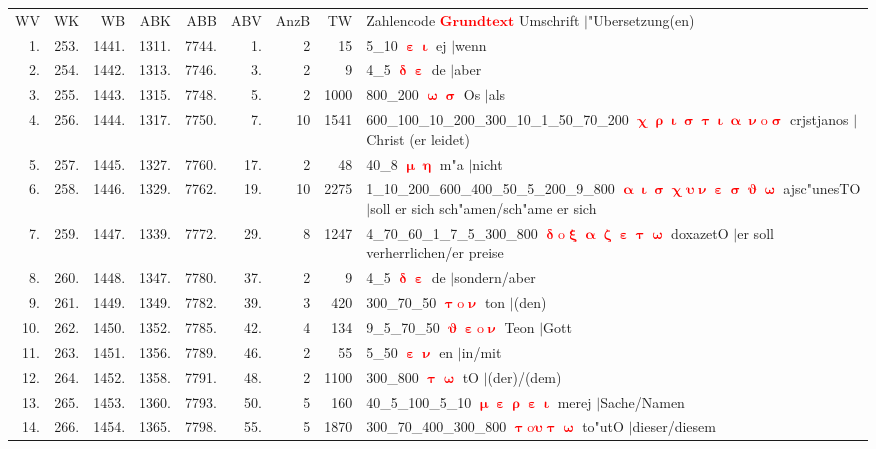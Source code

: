 \documentclass[a4paper,10pt,landscape]{article}
\begin{document}
\begin{tabular}{rrrrrrrrp{120mm}}
WV&WK&WB&ABK&ABB&ABV&AnzB&TW&Zahlencode \textcolor{red}{$\boldsymbol{Grundtext}$} Umschrift $|$"Ubersetzung(en)\\
1.&253.&1441.&1311.&7744.&1.&2&15&5\_10 \textcolor{red}{$\boldsymbol{\upepsilon\upiota}$} ej $|$wenn\\
2.&254.&1442.&1313.&7746.&3.&2&9&4\_5 \textcolor{red}{$\boldsymbol{\updelta\upepsilon}$} de $|$aber\\
3.&255.&1443.&1315.&7748.&5.&2&1000&800\_200 \textcolor{red}{$\boldsymbol{\upomega\upsigma}$} Os $|$als\\
4.&256.&1444.&1317.&7750.&7.&10&1541&600\_100\_10\_200\_300\_10\_1\_50\_70\_200 \textcolor{red}{$\boldsymbol{\upchi\uprho\upiota\upsigma\uptau\upiota\upalpha\upnu\mathrm{o}\upsigma}$} crjstjanos $|$Christ (er leidet)\\
5.&257.&1445.&1327.&7760.&17.&2&48&40\_8 \textcolor{red}{$\boldsymbol{\upmu\upeta}$} m"a $|$nicht\\
6.&258.&1446.&1329.&7762.&19.&10&2275&1\_10\_200\_600\_400\_50\_5\_200\_9\_800 \textcolor{red}{$\boldsymbol{\upalpha\upiota\upsigma\upchi\upsilon\upnu\upepsilon\upsigma\upvartheta\upomega}$} ajsc"unesTO $|$soll er sich sch"amen/sch"ame er sich\\
7.&259.&1447.&1339.&7772.&29.&8&1247&4\_70\_60\_1\_7\_5\_300\_800 \textcolor{red}{$\boldsymbol{\updelta\mathrm{o}\upxi\upalpha\upzeta\upepsilon\uptau\upomega}$} doxazetO $|$er soll verherrlichen/er preise\\
8.&260.&1448.&1347.&7780.&37.&2&9&4\_5 \textcolor{red}{$\boldsymbol{\updelta\upepsilon}$} de $|$sondern/aber\\
9.&261.&1449.&1349.&7782.&39.&3&420&300\_70\_50 \textcolor{red}{$\boldsymbol{\uptau\mathrm{o}\upnu}$} ton $|$(den)\\
10.&262.&1450.&1352.&7785.&42.&4&134&9\_5\_70\_50 \textcolor{red}{$\boldsymbol{\upvartheta\upepsilon\mathrm{o}\upnu}$} Teon $|$Gott\\
11.&263.&1451.&1356.&7789.&46.&2&55&5\_50 \textcolor{red}{$\boldsymbol{\upepsilon\upnu}$} en $|$in/mit\\
12.&264.&1452.&1358.&7791.&48.&2&1100&300\_800 \textcolor{red}{$\boldsymbol{\uptau\upomega}$} tO $|$(der)/(dem)\\
13.&265.&1453.&1360.&7793.&50.&5&160&40\_5\_100\_5\_10 \textcolor{red}{$\boldsymbol{\upmu\upepsilon\uprho\upepsilon\upiota}$} merej $|$Sache/Namen\\
14.&266.&1454.&1365.&7798.&55.&5&1870&300\_70\_400\_300\_800 \textcolor{red}{$\boldsymbol{\uptau\mathrm{o}\upsilon\uptau\upomega}$} to"utO $|$dieser/diesem\\
\end{tabular}\medskip \\
\end{document}

